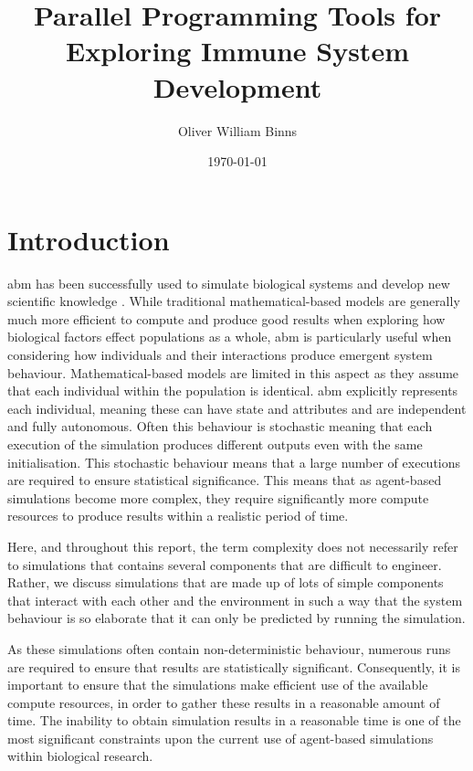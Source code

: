 \documentclass{UoYCSproject}
\title{Parallel Programming Tools for Exploring Immune System Development}
\author{Oliver William Binns}
\date{\today}
\begin{document}
\maketitle
\listoffigures
\printglossary[type=\acronymtype]
\printglossary


\chapter{Introduction}
\gls{abm} has been successfully used to simulate biological systems and develop new scientific knowledge \cite{kieran_thesis, flame_keratinocyte}.
While traditional mathematical-based models are generally much more efficient to compute and produce good results when exploring how biological factors effect populations as a whole, \gls{abm} is particularly useful when considering how individuals and their interactions produce emergent system behaviour.
Mathematical-based models are limited in this aspect as they assume that each individual within the population is identical.
\gls{abm} explicitly represents each individual, meaning these can have state and attributes and are independent and fully autonomous.
Often this behaviour is stochastic meaning that each execution of the simulation produces different outputs even with the same initialisation.
This stochastic behaviour means that a large number of executions are required to ensure statistical significance.
This means that as agent-based simulations become more complex, they require significantly more compute resources to produce results within a realistic period of time.

Here, and throughout this report, the term complexity does not necessarily refer to simulations that contains several components that are difficult to engineer.
Rather, we discuss simulations that are made up of lots of simple components that interact with each other and the environment in such a way that the system behaviour is so elaborate that it can only be predicted by running the simulation.

As these simulations often contain non-deterministic behaviour, numerous runs are required to ensure that results are statistically significant.
Consequently, it is important to ensure that the simulations make efficient use of the available compute resources, in order to gather these results in a reasonable amount of time.
The inability to obtain simulation results in a reasonable time is one of the most significant constraints upon the current use of agent-based simulations within biological research.
\end{document}

